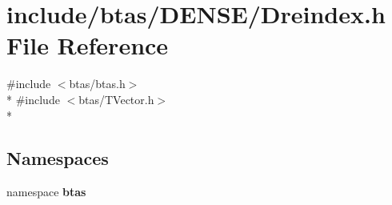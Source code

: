 \section{include/btas/\-D\-E\-N\-S\-E/\-Dreindex.h File Reference}
\label{d4/d02/Dreindex_8h}
{\ttfamily \#include $<$btas/btas.\-h$>$}\\*
{\ttfamily \#include $<$btas/\-T\-Vector.\-h$>$}\\*
\subsection*{Namespaces}
\begin{DoxyCompactItemize}
\item 
namespace {\bf btas}
\end{DoxyCompactItemize}
